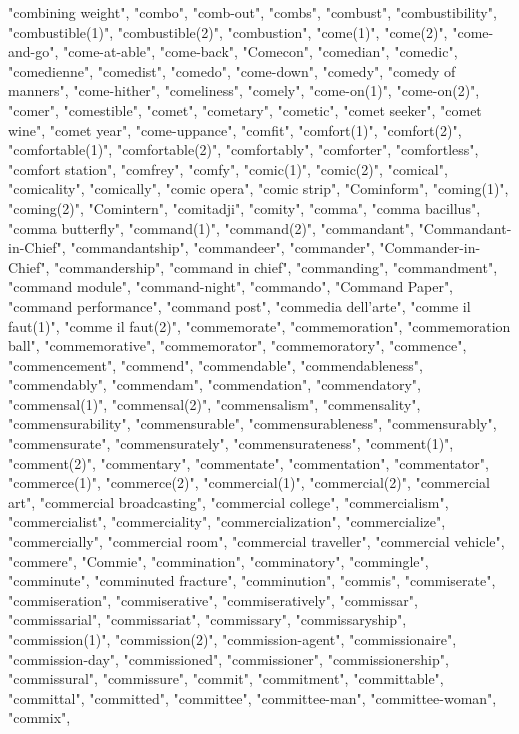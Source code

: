 "combining weight",
"combo",
"comb-out",
"combs",
"combust",
"combustibility",
"combustible(1)",
"combustible(2)",
"combustion",
"come(1)",
"come(2)",
"come-and-go",
"come-at-able",
"come-back",
"Comecon",
"comedian",
"comedic",
"comedienne",
"comedist",
"comedo",
"come-down",
"comedy",
"comedy of manners",
"come-hither",
"comeliness",
"comely",
"come-on(1)",
"come-on(2)",
"comer",
"comestible",
"comet",
"cometary",
"cometic",
"comet seeker",
"comet wine",
"comet year",
"come-uppance",
"comfit",
"comfort(1)",
"comfort(2)",
"comfortable(1)",
"comfortable(2)",
"comfortably",
"comforter",
"comfortless",
"comfort station",
"comfrey",
"comfy",
"comic(1)",
"comic(2)",
"comical",
"comicality",
"comically",
"comic opera",
"comic strip",
"Cominform",
"coming(1)",
"coming(2)",
"Comintern",
"comitadji",
"comity",
"comma",
"comma bacillus",
"comma butterfly",
"command(1)",
"command(2)",
"commandant",
"Commandant-in-Chief",
"commandantship",
"commandeer",
"commander",
"Commander-in-Chief",
"commandership",
"command in chief",
"commanding",
"commandment",
"command module",
"command-night",
"commando",
"Command Paper",
"command performance",
"command post",
"commedia dell'arte",
"comme il faut(1)",
"comme il faut(2)",
"commemorate",
"commemoration",
"commemoration ball",
"commemorative",
"commemorator",
"commemoratory",
"commence",
"commencement",
"commend",
"commendable",
"commendableness",
"commendably",
"commendam",
"commendation",
"commendatory",
"commensal(1)",
"commensal(2)",
"commensalism",
"commensality",
"commensurability",
"commensurable",
"commensurableness",
"commensurably",
"commensurate",
"commensurately",
"commensurateness",
"comment(1)",
"comment(2)",
"commentary",
"commentate",
"commentation",
"commentator",
"commerce(1)",
"commerce(2)",
"commercial(1)",
"commercial(2)",
"commercial art",
"commercial broadcasting",
"commercial college",
"commercialism",
"commercialist",
"commerciality",
"commercialization",
"commercialize",
"commercially",
"commercial room",
"commercial traveller",
"commercial vehicle",
"commere",
"Commie",
"commination",
"comminatory",
"commingle",
"comminute",
"comminuted fracture",
"comminution",
"commis",
"commiserate",
"commiseration",
"commiserative",
"commiseratively",
"commissar",
"commissarial",
"commissariat",
"commissary",
"commissaryship",
"commission(1)",
"commission(2)",
"commission-agent",
"commissionaire",
"commission-day",
"commissioned",
"commissioner",
"commissionership",
"commissural",
"commissure",
"commit",
"commitment",
"committable",
"committal",
"committed",
"committee",
"committee-man",
"committee-woman",
"commix",
